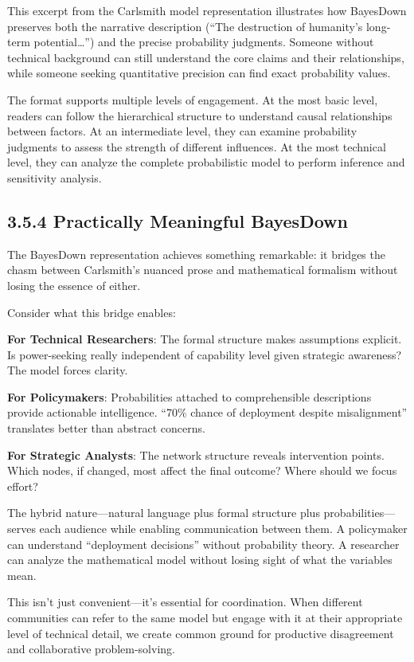 \documentclass[
  11pt,
  letterpaper,
]{book}
\begin{document}
\begin{landscape}
This excerpt from the Carlsmith model representation illustrates how
BayesDown preserves both the narrative description (``The destruction of
humanity's long-term potential\ldots{}'') and the precise probability
judgments. Someone without technical background can still understand the
core claims and their relationships, while someone seeking quantitative
precision can find exact probability values.

The format supports multiple levels of engagement. At the most basic
level, readers can follow the hierarchical structure to understand
causal relationships between factors. At an intermediate level, they can
examine probability judgments to assess the strength of different
influences. At the most technical level, they can analyze the complete
probabilistic model to perform inference and sensitivity analysis.

\subsection{3.5.4 Practically Meaningful
BayesDown}\label{sec-practically-meaningful}

The BayesDown representation achieves something remarkable: it bridges
the chasm between Carlsmith's nuanced prose and mathematical formalism
without losing the essence of either.

Consider what this bridge enables:

\textbf{For Technical Researchers}: The formal structure makes
assumptions explicit. Is power-seeking really independent of capability
level given strategic awareness? The model forces clarity.

\textbf{For Policymakers}: Probabilities attached to comprehensible
descriptions provide actionable intelligence. ``70\% chance of
deployment despite misalignment'' translates better than abstract
concerns.

\textbf{For Strategic Analysts}: The network structure reveals
intervention points. Which nodes, if changed, most affect the final
outcome? Where should we focus effort?

The hybrid nature---natural language plus formal structure plus
probabilities---serves each audience while enabling communication
between them. A policymaker can understand ``deployment decisions''
without probability theory. A researcher can analyze the mathematical
model without losing sight of what the variables mean.

This isn't just convenient---it's essential for coordination. When
different communities can refer to the same model but engage with it at
their appropriate level of technical detail, we create common ground for
productive disagreement and collaborative problem-solving.


\end{landscape}
\end{document}
